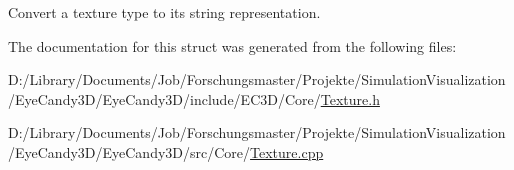 Convert a texture type to its string representation. 



The documentation for this struct was generated from the following files\+:\begin{DoxyCompactItemize}
\item 
D\+:/\+Library/\+Documents/\+Job/\+Forschungsmaster/\+Projekte/\+Simulation\+Visualization/\+Eye\+Candy3\+D/\+Eye\+Candy3\+D/include/\+E\+C3\+D/\+Core/\mbox{\hyperlink{_texture_8h}{Texture.\+h}}\item 
D\+:/\+Library/\+Documents/\+Job/\+Forschungsmaster/\+Projekte/\+Simulation\+Visualization/\+Eye\+Candy3\+D/\+Eye\+Candy3\+D/src/\+Core/\mbox{\hyperlink{_texture_8cpp}{Texture.\+cpp}}\end{DoxyCompactItemize}
